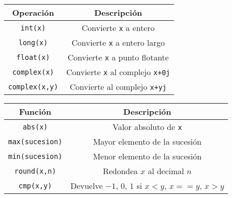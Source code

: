 \documentclass[12pt]{beamer}
\begin{document}
\begin{frame}
\fontsize{12}{12}\selectfont
\begin{center}
\begin{tabular}{| c | c |}
\hline
Operaci\'{o}n & Descripci\'{o}n \\
\hline \texttt{int(x)} & Convierte \texttt{x} a entero \\
\hline \texttt{long(x)} & Convierte \texttt{x} a entero largo \\
\hline \texttt{float(x)} & Convierte \texttt{x} a punto flotante \\
\hline \texttt{complex(x)} & Convierte \texttt{x} al complejo \texttt{x+0j} \\
\hline \texttt{complex(x,y)} & Convierte al complejo \texttt{x+yj} \\
\hline
\end{tabular}
\end{center}
\end{frame}
\begin{frame}
\fontsize{12}{12}\selectfont
\begin{center}
\begin{tabular}{| c | c |}
\hline
Funci\'{o}n & Descripci\'{o}n \\
\hline \texttt{abs(x)} & Valor absoluto de \texttt{x} \\
\hline \texttt{max(sucesion)} & Mayor elemento de la sucesi\'{o}n \\
\hline \texttt{min(sucesion)} & Menor elemento de la sucesi\'{o}n \\
\hline \texttt{round(x,n)} & Redondea $x$ al decimal $n$ \\
\hline \texttt{cmp(x,y)} & Devuelve $-1$, $0$, $1$ si $x<y$, $x==y$, $x>y$ \\
\hline
\end{tabular}
\end{center}
\end{frame}
\end{document}
